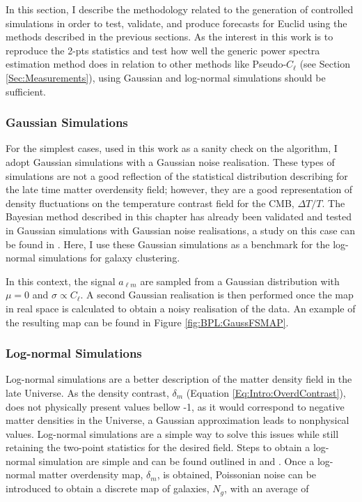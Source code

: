 \qquad In this section, I describe the methodology related to the generation of controlled simulations in order to test, validate, and produce forecasts for Euclid using the methods described in the previous sections.  As the interest in this work is to reproduce the 2-pts statistics and test how well the generic power spectra estimation method does in relation to other methods like Pseudo-$C_{\ell}$ (see Section \ref{Sec:Measurements}), using Gaussian and log-normal simulations should be sufficient.

\subsubsection{Gaussian Simulations}
For the simplest cases, used in this work as a sanity check on the algorithm, I adopt Gaussian simulations with a Gaussian noise realisation. These types of simulations are not a good reflection of the statistical distribution describing for the late time matter overdensity field; however, they are a good representation of density fluctuations on the temperature contrast field for the CMB, $\Delta T/T$. The Bayesian method described in this chapter has already been validated and tested in Gaussian simulations with Gaussian noise realisations, a study on this case can be found in \cite{SreeThesis}. Here, I use these Gaussian simulations as a benchmark for the log-normal simulations for galaxy clustering.

\qquad In this context, the signal $a_{\ell m}$ are sampled from a Gaussian distribution with $\mu = 0$ and $\sigma \propto C_{\ell}$. A second Gaussian realisation is then performed once the map in real space is calculated to obtain a noisy realisation of the data. An example of the resulting map can be found in Figure \ref{fig:BPL:GaussFSMAP}.

\subsubsection{Log-normal Simulations}
Log-normal simulations are a better description of the matter density field in the late Universe. As the density contrast, $\delta_m$ (Equation \ref{Eq:Intro:OverdContrast}), does not physically present values bellow -1, as it would correspond to negative matter densities in the
Universe, a Gaussian approximation leads to nonphysical values. Log-normal simulations are a simple way to solve this issues while still retaining the two-point statistics for the desired field. Steps to obtain a log-normal simulation are simple and can be found outlined in \cite{LoureiroMestrado} and \cite{Flask2016}. Once a log-normal matter overdensity map, $\delta_m$, is obtained, Poissonian noise can be introduced to obtain a discrete map of galaxies, $N_{g}$, with an average of

